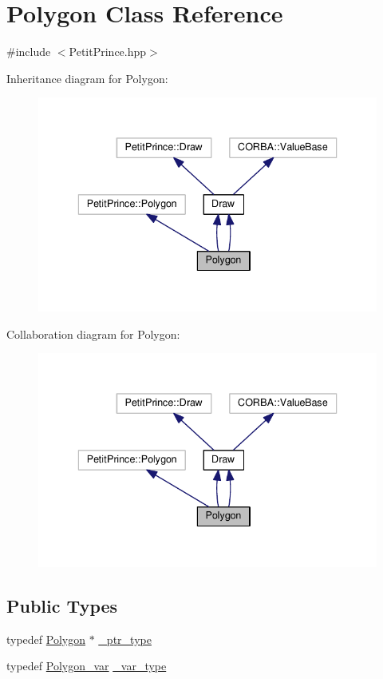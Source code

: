 \hypertarget{class_polygon}{}\section{Polygon Class Reference}
\label{class_polygon}


{\ttfamily \#include $<$Petit\+Prince.\+hpp$>$}



Inheritance diagram for Polygon\+:
\nopagebreak
\begin{figure}[H]
\begin{center}
\leavevmode
\includegraphics[width=336pt]{class_polygon__inherit__graph}
\end{center}
\end{figure}


Collaboration diagram for Polygon\+:
\nopagebreak
\begin{figure}[H]
\begin{center}
\leavevmode
\includegraphics[width=336pt]{class_polygon__coll__graph}
\end{center}
\end{figure}
\subsection*{Public Types}
\begin{DoxyCompactItemize}
\item 
typedef \hyperlink{class_polygon}{Polygon} $\ast$ \hyperlink{class_polygon_aeef4c9b11b0fb5fcb4c33aa181da7791}{\+\_\+ptr\+\_\+type}
\item 
typedef \hyperlink{_petit_prince_8hpp_a38c44f0def6ea90dd03bbb5e8f6b7713}{Polygon\+\_\+var} \hyperlink{class_polygon_aae841b2b5d390f037539fc5307bc50f6}{\+\_\+var\+\_\+type}
\end{DoxyCompactItemize}
